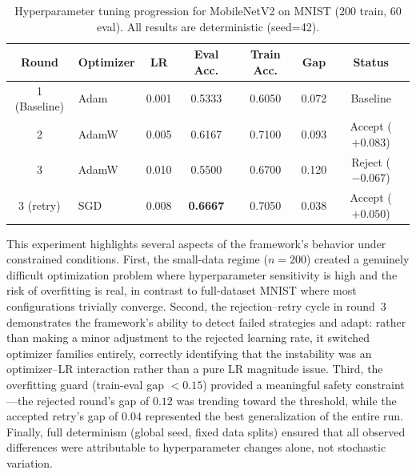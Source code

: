 \begin{table}[t]
  \centering
  \caption{Hyperparameter tuning progression for MobileNetV2 on MNIST (200 train, 60 eval). All results are deterministic (seed=42).}
  \label{tab:mnist-progression}
  \begin{tabular}{clccccc}
    \toprule
    Round & Optimizer & LR & Eval Acc. & Train Acc. & Gap & Status \\
    \midrule
    1 (Baseline) & Adam   & 0.001 & 0.5333 & 0.6050 & 0.072 & Baseline \\
    2             & AdamW  & 0.005 & 0.6167 & 0.7100 & 0.093 & Accept ($+0.083$) \\
    3             & AdamW  & 0.010 & 0.5500 & 0.6700 & 0.120 & Reject ($-0.067$) \\
    3 (retry)     & SGD    & 0.008 & \textbf{0.6667} & 0.7050 & 0.038 & Accept ($+0.050$) \\
    \bottomrule
  \end{tabular}
\end{table}

This experiment highlights several aspects of the framework's behavior under constrained conditions. First, the small-data regime ($n{=}200$) created a genuinely difficult optimization problem where hyperparameter sensitivity is high and the risk of overfitting is real, in contrast to full-dataset MNIST where most configurations trivially converge. Second, the rejection--retry cycle in round~3 demonstrates the framework's ability to detect failed strategies and adapt: rather than making a minor adjustment to the rejected learning rate, it switched optimizer families entirely, correctly identifying that the instability was an optimizer--LR interaction rather than a pure LR magnitude issue. Third, the overfitting guard (train-eval gap $< 0.15$) provided a meaningful safety constraint---the rejected round's gap of $0.12$ was trending toward the threshold, while the accepted retry's gap of $0.04$ represented the best generalization of the entire run. Finally, full determinism (global seed, fixed data splits) ensured that all observed differences were attributable to hyperparameter changes alone, not stochastic variation.
